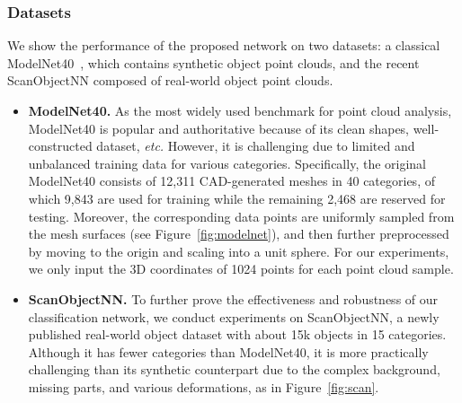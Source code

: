\documentclass[journal,twoside]{IEEEtran}
\newcommand{\latinphrase}[1]{\textit{#1}}
\newcommand{\etc}{\latinphrase{etc.}\xspace}
\begin{document}
\subsubsection{Datasets}
We show the performance of the proposed network on two datasets: a classical ModelNet40~\cite{wu20153d}, which contains synthetic object point clouds, and the recent ScanObjectNN \cite{Uy_2019_ICCV} composed of real-world object point clouds.
\begin{itemize}
 \item \textbf{ModelNet40.}  
As the most widely used benchmark for point cloud analysis, ModelNet40 is popular and authoritative because of its clean shapes, well-constructed dataset, \etc However, it is challenging due to limited and unbalanced training data for various categories. Specifically, the original ModelNet40 consists of 12,311 CAD-generated meshes in 40 categories, of which 9,843 are used for training while the remaining 2,468 are reserved for testing. Moreover, the corresponding data points are uniformly sampled from the mesh surfaces (see Figure~\ref{fig:modelnet}), and then further preprocessed by moving to the origin and scaling into a unit sphere. For our experiments, we only input the 3D coordinates  of 1024 points for each point cloud sample.
 
 \item \textbf{ScanObjectNN.} 
 To further prove the effectiveness and robustness of our classification network, we conduct experiments on ScanObjectNN, a newly published real-world object dataset with about 15k objects in 15 categories. Although it has fewer categories than ModelNet40, it is more practically challenging than its synthetic counterpart due to the complex background, missing parts, and various deformations, as in Figure~\ref{fig:scan}. 
\end{itemize}
\end{document}

